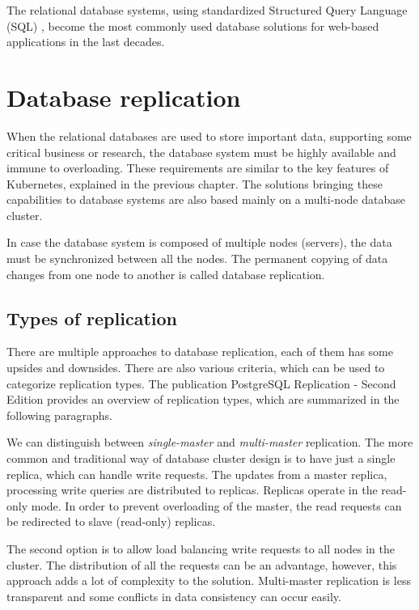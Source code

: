 \documentclass[
  digital, %
  twoside, %
  table,   %
  nolof,   %
  nolot,   %
]{fithesis3}
\begin{document}
The relational database systems, using standardized Structured Query Language (SQL) \cite{sql_standard}, become the most commonly used database solutions for web-based applications in the last decades.

\section{Database replication} \label{sec:db_replication}
When the relational databases are used to store important data, supporting some critical business or research, the database system must be highly available and immune to overloading. These requirements are similar to the key features of Kubernetes, explained in the previous chapter. The solutions bringing these capabilities to database systems are also based mainly on a multi-node database cluster.

In case the database system is composed of multiple nodes (servers), the data must be synchronized between all the nodes. The permanent copying of data changes from one node to another is called database replication.

\subsection{Types of replication} \label{sec:types_of_replication}
There are multiple approaches to database replication, each of them has some upsides and downsides. There are also various criteria, which can be used to categorize replication types. The publication PostgreSQL Replication - Second Edition \cite{pg} provides an overview of replication types, which are summarized in the following paragraphs.

We can distinguish between \textit{single-master} and  \textit{multi-master} replication. The more common and traditional way of database cluster design is to have just a single replica, which can handle write requests. The updates from a master replica, processing write queries are distributed to replicas. Replicas operate in the read-only mode. In order to prevent overloading of the master, the read requests can be redirected to slave (read-only) replicas.

The second option is to allow load balancing write requests to all nodes in the cluster. The distribution of all the requests can be an advantage, however, this approach adds a lot of complexity to the solution. Multi-master replication is less transparent and some conflicts in data consistency can occur easily.
\end{document}
